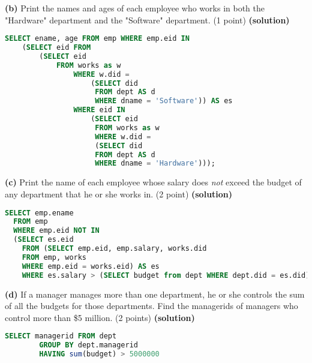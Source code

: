 \documentclass[11pt]{article}
\renewcommand\part[1]{\vspace{.10in}\textbf{(#1)}}
\begin{document}
\part{b} Print the names and ages of each employee who works in both the "Hardware" department and the "Software" department. (1 point)
\part{solution}
\begin{lstlisting}[language=SQL]
	 SELECT ename, age FROM emp WHERE emp.eid IN 
	(SELECT eid FROM
		(SELECT eid 
			FROM works as w
				WHERE w.did = 
					(SELECT did 
					 FROM dept AS d 
					 WHERE dname = 'Software')) AS es
				WHERE eid IN 
					(SELECT eid
					 FROM works as w
					 WHERE w.did = 
					 (SELECT did 
					 FROM dept AS d 
					 WHERE dname = 'Hardware')));
\end{lstlisting}


\part{c} Print the name of each employee whose salary does {\it not} exceed the budget of any department that he or she works in. (2 point)
\part{solution}

\begin{lstlisting}[language=SQL]
	SELECT emp.ename 
  FROM emp
  WHERE emp.eid NOT IN
  (SELECT es.eid 
    FROM (SELECT emp.eid, emp.salary, works.did
    FROM emp, works
    WHERE emp.eid = works.eid) AS es
    WHERE es.salary > (SELECT budget from dept WHERE dept.did = es.did));
\end{lstlisting}

\part{d} If a manager manages more than one department, he or she controls the sum of all the budgets for those departments. Find the managerids of managers who control more than \$5 million. (2 points)
\part{solution}

\begin{lstlisting}[language=SQL]
	SELECT managerid FROM dept
		GROUP BY dept.managerid
		HAVING sum(budget) > 5000000 
\end{lstlisting}
\end{document}
